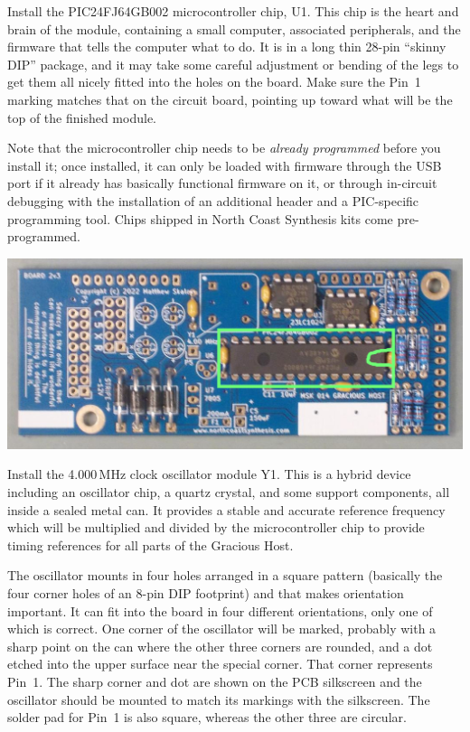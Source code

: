 Install the PIC24FJ64GB002 microcontroller chip, U1.  This chip is the heart
and brain of the module, containing a small computer, associated
peripherals, and the firmware that tells the computer what to do.  It is in
a long thin 28-pin ``skinny DIP'' package, and it may take some careful
adjustment or bending of the legs to get them all nicely fitted into the
holes on the board.  Make sure the Pin~1 marking matches that on the circuit
board, pointing up toward what will be the top of the finished module.

Note that the microcontroller chip needs to be \emph{already programmed}
before you install it; once installed, it can only be loaded with firmware
through the USB port if it already has basically functional firmware on it,
or through in-circuit debugging with the installation of an additional
header and a PIC-specific programming tool.  Chips shipped in North Coast
Synthesis kits come pre-programmed.

\nopagebreak
\noindent\includegraphics[width=\linewidth]{pic24fj64gb002.jpg}

Install the 4.000\,MHz clock oscillator module Y1.  This is a hybrid device
including an oscillator chip, a quartz crystal, and some support components,
all inside a sealed metal can.  It provides a stable and accurate reference
frequency which will be multiplied and divided by the microcontroller chip
to provide timing references for all parts of the Gracious Host.

The oscillator mounts in four holes arranged in a square pattern (basically
the four corner holes of an 8-pin DIP footprint) and that makes orientation
important.  It can fit into the board in four different orientations, only
one of which is correct.  One corner of the oscillator will be marked,
probably with a sharp point on the can where the other three corners are
rounded, and a dot etched into the upper surface near the special corner. 
That corner represents Pin~1.  The sharp corner and dot are shown on the PCB
silkscreen and the oscillator should be mounted to match its markings with
the silkscreen.  The solder pad for Pin~1 is also square, whereas the other
three are circular.

